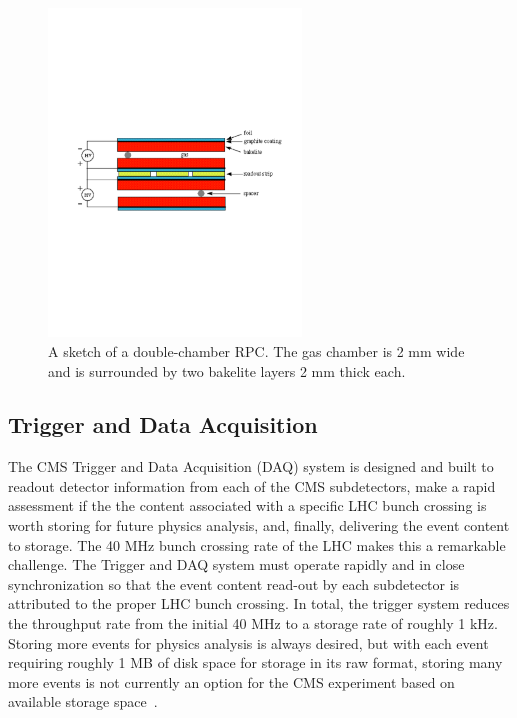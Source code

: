 \begin{figure}[htbp]
\centering
     \includegraphics[width=0.6\textwidth]{cms_and_lhc/plots/cms_muon_rpc.pdf}
     \caption{
A sketch of a double-chamber RPC. The gas chamber is 2 mm wide and is surrounded by two
bakelite layers 2 mm thick each.
     }
     \label{fig:cms_muon_rpc}
\end{figure}



\subsection{Trigger and Data Acquisition}
The CMS Trigger and Data Acquisition (DAQ) system is designed and built to readout detector
information from each of the CMS subdetectors, make a rapid assessment if the the content
associated with a specific LHC bunch crossing is worth storing for future physics analysis,
and, finally, delivering the event content to storage. The 40 MHz bunch crossing rate of
the LHC makes this a remarkable challenge. The Trigger and DAQ system must operate rapidly
and in close synchronization so that the event content read-out by each subdetector is attributed
to the proper LHC bunch crossing. In total, the trigger system reduces the throughput rate from the
initial 40 MHz to a storage rate of roughly 1 kHz. Storing more events for physics analysis is
always desired, but with each event requiring roughly 1 MB of disk space for storage in its
raw format, storing many more events is not currently an option for the CMS experiment based 
on available storage space~\cite{CMS-Proposal}. 



